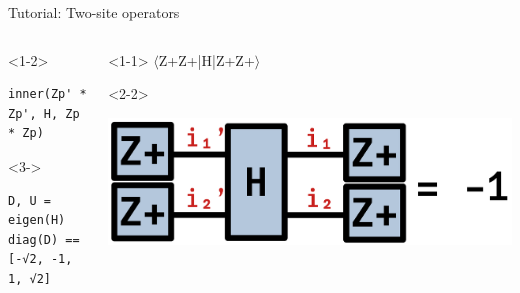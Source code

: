 \begin{frame}[fragile]{Tutorial: Two-site operators}

\begin{columns}

\begin{column}{5cm}

\begin{onlyenv}<1-2>
\begin{lstlisting}[language=JuliaLocal, style=julia, basicstyle=\small]
inner(Zp' * Zp', H, Zp * Zp)

\end{lstlisting}
\end{onlyenv}

\begin{onlyenv}<3->
\begin{lstlisting}[language=JuliaLocal, style=julia, basicstyle=\small]
D, U = eigen(H)
diag(D) == [-√2, -1, 1, √2]
\end{lstlisting}
\end{onlyenv}

\end{column}

\begin{column}{5cm}

\begin{onlyenv}<1-1>
$\langle$Z+Z+|H|Z+Z+$\rangle$ \\
\end{onlyenv}

\begin{onlyenv}<2-2>
\vspace*{0.0cm}
\begin{center}
\includegraphics[width=1.0\textwidth]{
  slides/assets/Zp1Zp2HZp1Zp2.png
}
\end{center}
\vspace*{0.0cm}
\end{onlyenv}



\end{column}
\end{columns}
\end{frame}
